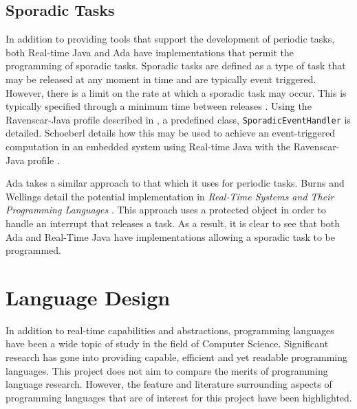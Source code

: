 \subsection{Sporadic Tasks}
In addition to providing tools that support the development of periodic tasks,
both Real-time Java and Ada have implementations that permit the programming of
sporadic tasks.  Sporadic tasks are defined as a type of task that may be
released at any moment in time and are typically event triggered. However,
there is a limit on the rate at which a sporadic task may occur. This is
typically specified through a minimum time between releases \cite{11111101}.
Using the Ravenscar-Java profile described in \cite{ravenscar-java}, a
predefined class, \texttt{SporadicEventHandler} is detailed. Schoeberl details
how this may be used to achieve an event-triggered computation in an embedded
system using Real-time Java with the Ravenscar-Java profile \cite{1300334}.
\par\bigskip\noindent
Ada takes a similar approach to that which it uses for periodic tasks. Burns
and Wellings detail the potential implementation in \emph{Real-Time Systems and
Their Programming Languages} \cite[p341]{real-time-systems}.  This approach
uses a protected object in order to handle an interrupt that releases a task.
As a result, it is clear to see that both Ada and Real-Time Java have
implementations allowing a sporadic task to be programmed. 

\section{Language Design} In addition to real-time capabilities and
abstractions, programming languages have been a wide topic of study in the
field of Computer Science. Significant research has gone into providing
capable, efficient and yet readable programming languages. This project
does not aim to compare the merits of programming language research. However, the
feature and literature surrounding aspects of programming languages that are of
interest for this project have been highlighted. 

